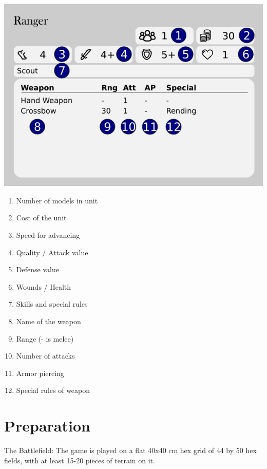 \documentclass[6pt]{scrreport}
\begin{document}
	\begin{minipage}{0.5\textwidth}
 \includegraphics[width=\textwidth]{card-with-numbers.png}
	\end{minipage}
	\begin{minipage}{0.5\textwidth}
    \begin{enumerate}[noitemsep]
      \item Number of models in unit
      \item Cost of the unit
      \item Speed for advancing
      \item Quality / Attack value
      \item Defense value
      \item Wounds / Health
      \item Skills and special rules
      \item Name of the weapon
      \item Range (- is melee)
      \item Number of attacks
      \item Armor piercing
      \item Special rules of weapon
    \end{enumerate}
 	\end{minipage}

\chapter*{Preparation}

  The Battlefield: The game is played on a
  flat 40x40 cm hex grid of 44 by 50 hex fields,
  with at least 15-20 pieces of terrain on it.
\end{document}
